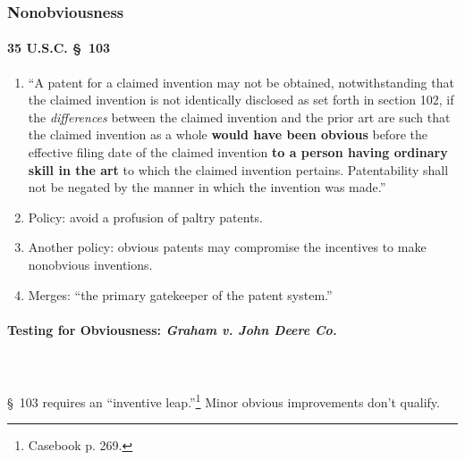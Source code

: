 \subsubsection{Nonobviousness}

\paragraph{35 U.S.C. \S\ 103}

\begin{enumerate}
    \item ``A patent for a claimed invention may not be obtained, 
    notwithstanding that the claimed invention is not identically disclosed as 
    set forth in section 102, if the \emph{differences} between the claimed 
    invention and the prior art are such that the claimed invention as a whole 
    \textbf{would have been obvious} before the effective filing date of the 
    claimed invention \textbf{to a person having ordinary skill in the art} to 
    which the claimed invention pertains. Patentability shall not be negated 
    by the manner in which the invention was made.''
    \item Policy: avoid a profusion of paltry patents.
    \item Another policy: obvious patents may compromise the incentives to 
    make nonobvious inventions.
    \item Merges: ``the primary gatekeeper of the patent system.''
\end{enumerate}

\paragraph{Testing for Obviousness: \emph{Graham v. John Deere Co.}}
~\\\\
\S\ 103 requires an ``inventive leap.''\footnote{Casebook p. 269.} Minor obvious 
improvements don't qualify.

